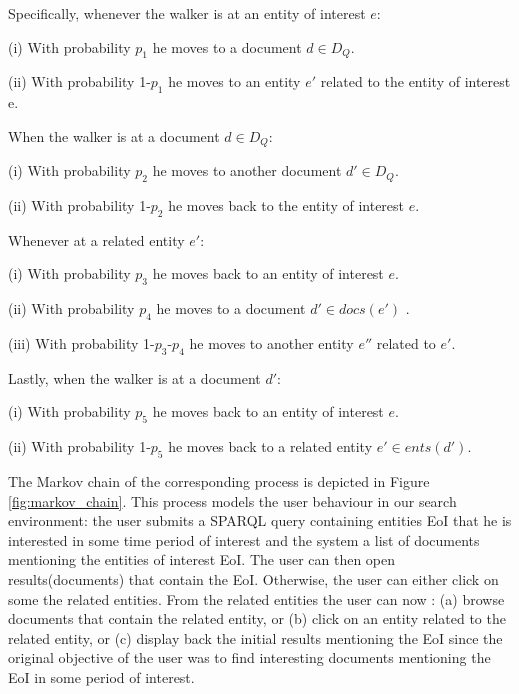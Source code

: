 \documentclass{article}
\begin{document}
\vspace{2mm}\noindent 
Specifically, whenever the walker is at an entity of 
interest $e$:
\begin{compactitem}
\item[(i)]  With probability $p_1$ he moves to a document $d \in D_Q$.
\item[(ii)] With probability 1-$p_1$ he moves to an entity $e'$ related 
            to the entity of interest e.
\end{compactitem}

\vspace{2mm}\noindent
When the walker is at a document $d \in D_Q$:
\begin{compactitem}
\item[(i)]  With probability $p_2$ he moves to another document $d' \in D_Q$.
\item[(ii)] With probability 1-$p_2$ he moves back to the entity of interest $e$.
\end{compactitem}

\vspace{2mm}\noindent
Whenever at a related entity $e'$:
\begin{compactitem}
\item[(i)]   With probability $p_3$ he moves back to an entity of interest $e$.
\item[(ii)]  With probability $p_4$ he moves to a document $d' \in docs(e')$ .
\item[(iii)] With probability 1-$p_3$-$p_4$ he moves to another entity $e''$ 
             related to $e'$.
\end{compactitem}

\vspace{2mm}\noindent
Lastly, when the walker is at a document $d'$:
\begin{compactitem}
\item[(i)]  With probability $p_5$ he moves back to an entity of interest $e$.
\item[(ii)] With probability 1-$p_5$ he moves back to a related entity 
$e' \in ents(d')$.
\end{compactitem}

\vspace{2mm}\noindent
The Markov chain of the corresponding process is depicted in Figure
\ref{fig:markov_chain}.
This process models the user behaviour in our search environment: 
the user submits a SPARQL query containing entities EoI that he is interested 
in some time period of interest
and the system a list of documents mentioning the entities of interest EoI. 
The user can then open results(documents) that contain the EoI. 
Otherwise, the user can either click on some the related entities. 
From the related entities the user can now :
(a) browse documents that contain the related entity, or
(b) click on an entity related to the related entity, or
(c) display back the initial results mentioning the EoI since the original 
    objective of the user was to find interesting documents mentioning the 
    EoI in some period of interest.
\end{document}
